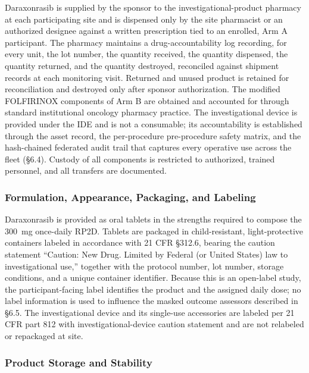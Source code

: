 Daraxonrasib is supplied by the sponsor to the investigational-product pharmacy at
each participating site and is dispensed only by the site pharmacist or an
authorized designee against a written prescription tied to an enrolled,
Arm A participant. The pharmacy maintains a drug-accountability log recording, for
every unit, the lot number, the quantity received, the quantity dispensed, the
quantity returned, and the quantity destroyed, reconciled against shipment records
at each monitoring visit. Returned and unused product is retained for reconciliation
and destroyed only after sponsor authorization. The modified FOLFIRINOX components
of Arm B are obtained and accounted for through standard institutional oncology
pharmacy practice. The investigational device is provided under the IDE and is not a
consumable; its accountability is established through the asset record, the
per-procedure pre-procedure safety matrix, and the hash-chained federated audit
trail that captures every operative use across the fleet (\S6.4). Custody of all
components is restricted to authorized, trained personnel, and all transfers are
documented.

\subsubsection{Formulation, Appearance, Packaging, and Labeling}

Daraxonrasib is provided as oral tablets in the strengths required to compose the
300~mg once-daily RP2D. Tablets are packaged in child-resistant, light-protective
containers labeled in accordance with 21 CFR \S312.6, bearing the caution statement
``Caution: New Drug. Limited by Federal (or United States) law to investigational
use,'' together with the protocol number, lot number, storage conditions, and a
unique container identifier. Because this is an open-label study, the
participant-facing label identifies the product and the assigned daily dose; no
label information is used to influence the masked outcome assessors described in
\S6.5. The investigational device and its single-use accessories are labeled per
21 CFR part 812 with investigational-device caution statement and are not
relabeled or repackaged at site.

\subsubsection{Product Storage and Stability}

